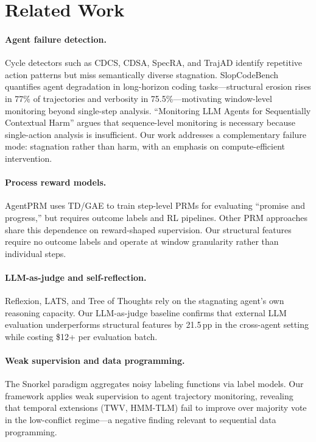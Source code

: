 \documentclass[11pt,a4paper]{article}
\begin{document}
\section{Related Work}

\paragraph{Agent failure detection.}
Cycle detectors such as CDCS, CDSA, SpecRA, and TrajAD identify repetitive action patterns but miss semantically diverse stagnation.
SlopCodeBench~\citep{slopcodebench2026} quantifies agent degradation in long-horizon coding tasks---structural erosion rises in 77\% of trajectories and verbosity in 75.5\%---motivating window-level monitoring beyond single-step analysis.
``Monitoring LLM Agents for Sequentially Contextual Harm'' argues that sequence-level monitoring is necessary because single-action analysis is insufficient.
Our work addresses a complementary failure mode: stagnation rather than harm, with an emphasis on compute-efficient intervention.

\paragraph{Process reward models.}
AgentPRM uses TD/GAE to train step-level PRMs for evaluating ``promise and progress,'' but requires outcome labels and RL pipelines.
Other PRM approaches share this dependence on reward-shaped supervision.
Our structural features require no outcome labels and operate at window granularity rather than individual steps.

\paragraph{LLM-as-judge and self-reflection.}
Reflexion, LATS, and Tree of Thoughts rely on the stagnating agent's own reasoning capacity.
Our LLM-as-judge baseline confirms that external LLM evaluation underperforms structural features by 21.5\,pp in the cross-agent setting while costing \$12+ per evaluation batch.

\paragraph{Weak supervision and data programming.}
The Snorkel paradigm aggregates noisy labeling functions via label models.
Our framework applies weak supervision to agent trajectory monitoring, revealing that temporal extensions (TWV, HMM-TLM) fail to improve over majority vote in the low-conflict regime---a negative finding relevant to sequential data programming.
\end{document}
